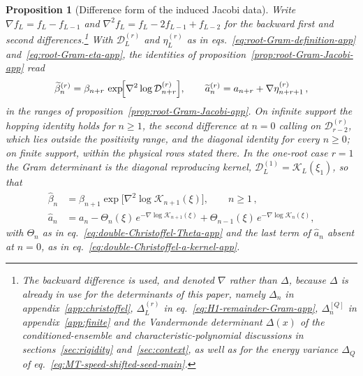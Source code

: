 \documentclass[a4paper,11pt]{article}
\def\ee{e}%
\newtheorem{proposition}{Proposition}[section]
\theoremstyle{definition}
\theoremstyle{remark}
\newcommand{\ee}{\mathrm e}
\begin{document}
\begin{proposition}[Difference form of the induced Jacobi data]
\label{prop:kernel-difference-form-app}
Write $\nabla f_L=f_L-f_{L-1}$ and $\nabla^2f_L=f_L-2f_{L-1}+f_{L-2}$ for the backward first and
second differences.\footnote{The backward difference is used, and denoted $\nabla$ rather than
$\Delta$, because $\Delta$ is already in use for the determinants of this paper, namely $\Delta_n$ in
appendix~\ref{app:christoffel}, $\Delta_L^{(r)}$ in eq.~\eqref{eq:H1-remainder-Gram-app},
$\Delta_n^{[Q]}$ in appendix~\ref{app:finite} and the Vandermonde determinant $\Delta(x)$ of
the conditioned-ensemble and characteristic-polynomial discussions in
sections~\ref{sec:rigidity} and~\ref{sec:context}, as well as for the energy
variance $\Delta_Q$ of eq.~\eqref{eq:MT-speed-shifted-seed-main}.} With $\mathcal D_L^{(r)}$ and $\eta_L^{(r)}$ as in
eqs.~\eqref{eq:root-Gram-definition-app} and~\eqref{eq:root-Gram-eta-app}, the identities of
proposition~\ref{prop:root-Gram-Jacobi-app} read
\begin{equation}
   \widetilde\beta_n^{(r)}
   =\beta_{n+r}\,
   \exp\!\Bigl[\nabla^2\log\mathcal D_{n+r}^{(r)}\Bigr],
   \qquad
   \widetilde a_n^{(r)}
   =a_{n+r}+\nabla\eta_{n+r+1}^{(r)} \,,
   \label{eq:kernel-difference-form-app}
\end{equation}
in the ranges of proposition~\ref{prop:root-Gram-Jacobi-app}. On infinite support the hopping
identity holds for $n\ge1$, the second difference at $n=0$ calling on $\mathcal D_{r-2}^{(r)}$,
which lies outside the positivity range, and the diagonal identity for every $n\ge0$; on finite
support, within the physical rows stated there. In the one-root case $r=1$ the Gram determinant is
the diagonal reproducing kernel, $\mathcal D_L^{(1)}=\mathcal K_L(\xi_1)$, so that
\begin{equation}
\begin{aligned}
   \widehat\beta_n
   &=\beta_{n+1}\exp\!\bigl[\nabla^2\log\mathcal K_{n+1}(\xi)\bigr],
   \qquad n\ge1\,,\\
   \widehat a_n
   &=a_n-\Theta_n(\xi)\,\ee^{-\nabla\log\mathcal K_{n+1}(\xi)}
        +\Theta_{n-1}(\xi)\,\ee^{-\nabla\log\mathcal K_{n}(\xi)},
\end{aligned}
   \label{eq:one-root-difference-form-app}
\end{equation}
with $\Theta_n$ as in eq.~\eqref{eq:double-Christoffel-Theta-app} and the last term of
$\widehat a_n$ absent at $n=0$, as in
eq.~\eqref{eq:double-Christoffel-a-kernel-app}.
\end{proposition}
\end{document}
